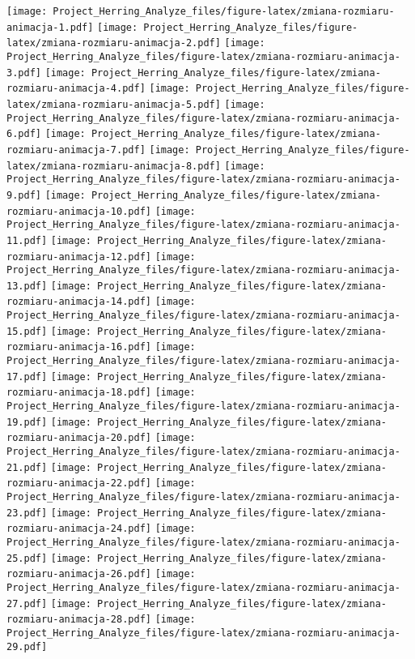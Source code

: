 \documentclass[]{article}
\begin{document}
\texttt{[image: Project\_Herring\_Analyze\_files/figure-latex/zmiana-rozmiaru-animacja-1.pdf]}
\texttt{[image: Project\_Herring\_Analyze\_files/figure-latex/zmiana-rozmiaru-animacja-2.pdf]}
\texttt{[image: Project\_Herring\_Analyze\_files/figure-latex/zmiana-rozmiaru-animacja-3.pdf]}
\texttt{[image: Project\_Herring\_Analyze\_files/figure-latex/zmiana-rozmiaru-animacja-4.pdf]}
\texttt{[image: Project\_Herring\_Analyze\_files/figure-latex/zmiana-rozmiaru-animacja-5.pdf]}
\texttt{[image: Project\_Herring\_Analyze\_files/figure-latex/zmiana-rozmiaru-animacja-6.pdf]}
\texttt{[image: Project\_Herring\_Analyze\_files/figure-latex/zmiana-rozmiaru-animacja-7.pdf]}
\texttt{[image: Project\_Herring\_Analyze\_files/figure-latex/zmiana-rozmiaru-animacja-8.pdf]}
\texttt{[image: Project\_Herring\_Analyze\_files/figure-latex/zmiana-rozmiaru-animacja-9.pdf]}
\texttt{[image: Project\_Herring\_Analyze\_files/figure-latex/zmiana-rozmiaru-animacja-10.pdf]}
\texttt{[image: Project\_Herring\_Analyze\_files/figure-latex/zmiana-rozmiaru-animacja-11.pdf]}
\texttt{[image: Project\_Herring\_Analyze\_files/figure-latex/zmiana-rozmiaru-animacja-12.pdf]}
\texttt{[image: Project\_Herring\_Analyze\_files/figure-latex/zmiana-rozmiaru-animacja-13.pdf]}
\texttt{[image: Project\_Herring\_Analyze\_files/figure-latex/zmiana-rozmiaru-animacja-14.pdf]}
\texttt{[image: Project\_Herring\_Analyze\_files/figure-latex/zmiana-rozmiaru-animacja-15.pdf]}
\texttt{[image: Project\_Herring\_Analyze\_files/figure-latex/zmiana-rozmiaru-animacja-16.pdf]}
\texttt{[image: Project\_Herring\_Analyze\_files/figure-latex/zmiana-rozmiaru-animacja-17.pdf]}
\texttt{[image: Project\_Herring\_Analyze\_files/figure-latex/zmiana-rozmiaru-animacja-18.pdf]}
\texttt{[image: Project\_Herring\_Analyze\_files/figure-latex/zmiana-rozmiaru-animacja-19.pdf]}
\texttt{[image: Project\_Herring\_Analyze\_files/figure-latex/zmiana-rozmiaru-animacja-20.pdf]}
\texttt{[image: Project\_Herring\_Analyze\_files/figure-latex/zmiana-rozmiaru-animacja-21.pdf]}
\texttt{[image: Project\_Herring\_Analyze\_files/figure-latex/zmiana-rozmiaru-animacja-22.pdf]}
\texttt{[image: Project\_Herring\_Analyze\_files/figure-latex/zmiana-rozmiaru-animacja-23.pdf]}
\texttt{[image: Project\_Herring\_Analyze\_files/figure-latex/zmiana-rozmiaru-animacja-24.pdf]}
\texttt{[image: Project\_Herring\_Analyze\_files/figure-latex/zmiana-rozmiaru-animacja-25.pdf]}
\texttt{[image: Project\_Herring\_Analyze\_files/figure-latex/zmiana-rozmiaru-animacja-26.pdf]}
\texttt{[image: Project\_Herring\_Analyze\_files/figure-latex/zmiana-rozmiaru-animacja-27.pdf]}
\texttt{[image: Project\_Herring\_Analyze\_files/figure-latex/zmiana-rozmiaru-animacja-28.pdf]}
\texttt{[image: Project\_Herring\_Analyze\_files/figure-latex/zmiana-rozmiaru-animacja-29.pdf]}
\end{document}

